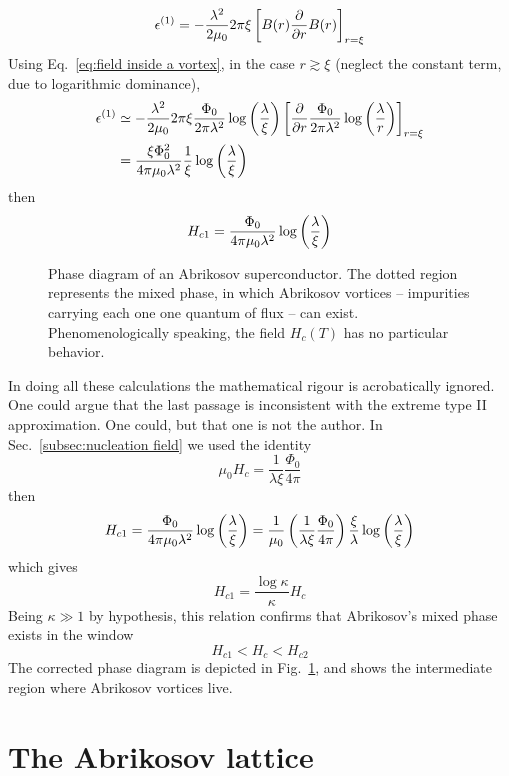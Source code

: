 \[
    \epsilon^{(1)} = - \frac{\lambda^2}{2\mu_0} 2\pi\xi \left[{B(r) \pdv{}{r} B(r)}\right]_{r=\xi}
\]
Using Eq.~\eqref{eq:field inside a vortex}, in the case $r\gtrsim \xi$ (neglect the constant term, due to logarithmic dominance),
\[
\begin{aligned}
    \epsilon^{(1)} &\simeq - \frac{\lambda^2}{2\mu_0} 2\pi\xi \frac{\Phi_0}{2\pi \lambda^2} \log\left({\frac{\lambda}{\xi}}\right) \left[{ \pdv{}{r} \frac{\Phi_0}{2\pi \lambda^2} \log\left({\frac{\lambda}{r}}\right) }\right]_{r=\xi} \\
    &= \frac{\xi \Phi_0^2}{4\pi\mu_0 \lambda^2} \frac{1}{\xi} \log\left({\frac{\lambda}{\xi}}\right)
\end{aligned}
\]
then
\[
    H_{c1} = \frac{\Phi_0}{4\pi\mu_0 \lambda^2} \log\left({\frac{\lambda}{\xi}}\right)
\]

\begin{figure}
	\centering
	
	\caption{Phase diagram of an Abrikosov superconductor. The dotted region represents the mixed phase, in which Abrikosov vortices -- impurities carrying each one one quantum of flux -- can exist. Phenomenologically speaking, the field $H_c(T)$ has no particular behavior.}
	\label{type ii abrikosov superconductor phase diagram}
\end{figure}

In doing all these calculations the mathematical rigour is acrobatically ignored. One could argue that the last passage is inconsistent with the extreme type II approximation. One could, but that one is not the author. In Sec.~\ref{subsec:nucleation field} we used the identity
\[
    \mu_0 H_c = \frac{1}{\lambda\xi} \frac{\Phi_0}{4\pi}
\]
then
\[
    H_{c1} = \frac{\Phi_0}{4\pi\mu_0 \lambda^2} \log\left({\frac{\lambda}{\xi}}\right) = \frac{1}{\mu_0} \left({\frac{1}{\lambda\xi} \frac{\Phi_0}{4\pi}}\right) \frac{\xi}{\lambda} \log\left({\frac{\lambda}{\xi}}\right)
\]
which gives
\[
    H_{c1} = \frac{\log\kappa}{\kappa} H_c
\]
Being $\kappa\gg1$ by hypothesis, this relation confirms that Abrikosov's mixed phase exists in the window
\[
    H_{c1} < H_c < H_{c2}
\]
The corrected phase diagram is depicted in Fig.~\ref{type ii abrikosov superconductor phase diagram}, and shows the intermediate region where Abrikosov vortices live.

\section{The Abrikosov lattice}


